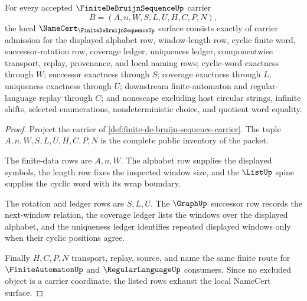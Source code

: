 \begin{theorem}
\label{thm:finite-de-bruijn-sequence-obligation-surface}
For every accepted $\FiniteDeBruijnSequenceUp$ carrier
$$
B=(A,n,W,S,L,U,H,C,P,N),
$$
the local $\NameCert_{\FiniteDeBruijnSequenceUp}$ surface consists exactly of carrier admission for the displayed alphabet row, window-length row, cyclic finite word, successor-rotation row, coverage ledger, uniqueness ledger, componentwise transport, replay, provenance, and local naming rows; cyclic-word exactness through $W$; successor exactness through $S$; coverage exactness through $L$; uniqueness exactness through $U$; downstream finite-automaton and regular-language replay through $C$; and nonescape excluding host circular strings, infinite shifts, selected enumerations, nondeterministic choice, and quotient word equality.
\end{theorem}
\begin{proof}
Project the carrier of \autoref{def:finite-de-bruijn-sequence-carrier}. The tuple $A,n,W,S,L,U,H,C,P,N$ is the complete public inventory of the packet.

The finite-data rows are $A,n,W$. The alphabet row supplies the displayed symbols, the length row fixes the inspected window size, and the $\ListUp$ spine supplies the cyclic word with its wrap boundary.

The rotation and ledger rows are $S,L,U$. The $\GraphUp$ successor row records the next-window relation, the coverage ledger lists the windows over the displayed alphabet, and the uniqueness ledger identifies repeated displayed windows only when their cyclic positions agree.

Finally $H,C,P,N$ transport, replay, source, and name the same finite route for $\FiniteAutomatonUp$ and $\RegularLanguageUp$ consumers. Since no excluded object is a carrier coordinate, the listed rows exhaust the local NameCert surface.
\end{proof}

